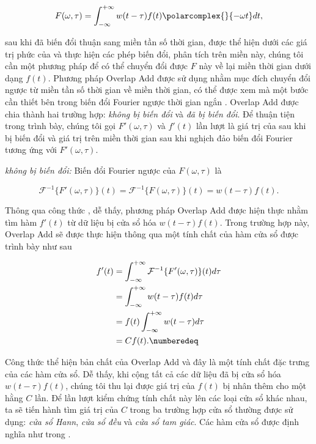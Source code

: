 			\begin{equation*}
				F(\omega, \tau) = \int_{-\infty}^{+\infty} w(t - \tau) f(t) \polarcomplex{}{-\omega t} dt,
			\end{equation*}
			
		\noindent sau khi đã biến đổi thuận sang miền tần số thời gian, được thể hiện dưới các giá trị phức của \spectrogram{} và thực hiện các phép biến đổi, phân tích trên miền này, chúng tôi cần một phương pháp để có thể chuyển đổi được \spectrogram{} $F$ này về lại miền thời gian dưới dạng $f(t)$. Phương pháp Overlap Add được sử dụng nhằm mục đích chuyển đổi ngược từ miền tần số thời gian về miền thời gian, có thể được xem mà một bước cần thiết bên trong biến đổi Fourier ngược thời gian ngắn \cite{stft_allen, stft_allen_rabiner}. Overlap Add được chia thành hai trường hợp: \textit{\spectrogram{} không bị biến đổi} và \textit{\spectrogram{} đã bị biến đổi}. Để thuận tiện trong trình bày, chúng tôi gọi $F'(\omega, \tau)$ và $f'(t)$ lần lượt là giá trị của \spectrogram{} sau khi bị biến đổi và giá trị trên miền thời gian sau khi nghịch đảo biến đổi Fourier tương ứng với $F'(\omega, \tau)$. 
		
		\textit{\Spectrogram{} không bị biến đổi:} Biến đổi Fourier ngược của $F(\omega, \tau)$ là
		
			\begin{equation}
				\mathcal{F}^{-1}\{F'(\omega, \tau)\}(t) = \mathcal{F}^{-1}\{F(\omega, \tau)\}(t) = w(t - \tau) f(t).
				\label{ola::non_modified_spectrogram_f}
			\end{equation}
		
		Thông qua công thức , dễ thấy, phương pháp Overlap Add được hiện thực nhằm tìm hàm $f'(t)$ từ dữ liệu bị cửa sổ hóa $w(t - \tau) f(t)$. Trong trường hợp này, Overlap Add sẽ được thực hiện thông qua một tính chất của hàm cửa sổ được trình bày như sau
		
			\begin{align*}
				f'(t)	& = \int_{-\infty}^{+\infty} \mathcal{F}^{-1}\{F'(\omega, \tau)\}(t) d\tau \\
						& = \int_{-\infty}^{+\infty} w(t - \tau) f(t) d\tau \\
						& = f(t) \int_{-\infty}^{+\infty} w(t - \tau) d\tau \\
						& = C f(t). \numberedeq
				\label{ola:non_modified_spectrogram_main_formula}
			\end{align*}
		
		Công thức  thể hiện bản chất của Overlap Add và đây là một tính chất đặc trưng của các hàm cửa sổ. Dễ thấy, khi cộng tất cả các dữ liệu đã bị cửa sổ hóa $w(t - \tau) f(t)$, chúng tôi thu lại được giá trị của $f(t)$ bị nhân thêm cho một hằng $C$ lần. Để lần lượt kiểm chứng tính chất này lên các loại cửa sổ khác nhau, ta sẽ tiến hành tìm giá trị của $C$ trong ba trường hợp cửa sổ thường được sử dụng: \textit{cửa sổ Hann}, \textit{cửa sổ đều} và \textit{cửa sổ tam giác}. Các hàm cửa sổ được định nghĩa như trong .
		
